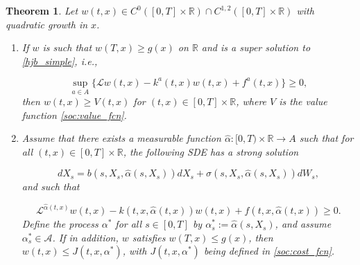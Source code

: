 \documentclass{article}
\newtheorem{theorem}{Theorem}
\begin{document}
\begin{theorem}
Let $w(t,x)\in C^0([0,T]\times\mathbb{R})\cap C^{1,2}([0,T]\times\mathbb{R})$ with quadratic growth in $x$. 
\begin{enumerate}
\item
If $w$ is such that $w(T,x)\geq g(x)$ on $\mathbb{R}$ and is a super solution to \eqref{hjb_simple}, i.e.,

\begin{equation} \label{soc:ver}
\sup_{a\in A}\{\mathcal{L}w(t,x)-k^a(t,x)w(t,x)+f^a(t,x)\}\geq0,
\end{equation}
then $w(t,x)\geq V(t,x)$ for $(t,x)\in[0,T]\times\mathbb{R}$, where $V$ is the value function \eqref{soc:value_fcn}.

\item
Assume that there exists a measurable function $\hat{\alpha}:[0,T)\times\mathbb{R}\rightarrow A$ such that for all $(t,x)\in[0,T]\times\mathbb{R}$, the following SDE has a strong solution

\begin{equation}
dX_s=b(s,X_s,\hat{\alpha}(s,X_s))dX_s+\sigma(s,X_s,\hat{\alpha}(s,X_s))dW_s,
\end{equation}
and such that

\begin{equation}
\mathcal{L}^{\hat{\alpha}(t,x)}w(t,x)-k(t,x,\hat{\alpha}(t,x))w(t,x)+f(t,x,\hat{\alpha}(t,x))\geq0.
\end{equation}
Define the process $\alpha^*$ for all $s\in[0,T]$ by $\alpha^*_s:=\hat{\alpha}(s,X_s)$, and assume $\alpha^*_s\in\mathcal{A}$. If in addition, $w$ satisfies $w(T,x)\leq g(x)$, then $w(t,x)\leq J(t,x,\alpha^*)$, with $J(t,x,\alpha^*)$ being defined in \eqref{soc:cost_fcn}.
\end{enumerate}
\end{theorem}
\end{document}
